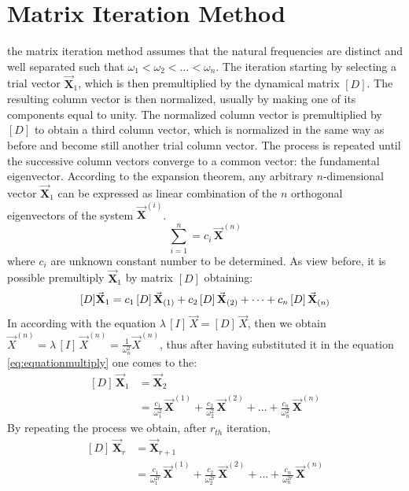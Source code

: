 \section{Matrix Iteration Method}\label{sec:mim}
the matrix iteration method assumes that the natural frequencies are distinct
and well separated such that \(\omega_1 < \omega_2 < \dots < \omega_n\).
The iteration starting by selecting a trial vector \(\vec{\mathbf{X}}_{1}\),
which is then premultiplied by the dynamical matrix \([D]\).
The resulting column vector is then normalized, usually by making one of its
components equal to unity.
The normalized column vector is premultiplied by \([D]\) to obtain a third
column vector, which is normalized in the same way as before and become still
another trial column vector.
The process is repeated until the successive column vectors converge to a common
vector: the fundamental eigenvector.
According to the expansion theorem, any arbitrary \(n\)-dimensional vector
\(\vec{\mathbf{X}}_{1}\) can be expressed as linear combination of the \(n\)
orthogonal eigenvectors of the system \(\vec{\mathbf{X}}^{(i)}\).
\begin{equation}\label{eq:expasniontheorem}
	\sum_{i = 1}^{n} = c_{i}\,\vec{\mathbf{X}}^{(n)}
\end{equation}
where \(c_{i}\) are unknown constant number to be determined.
As view before, it is possible premultiply \(\vec{\mathbf{X}}_{1}\) by matrix
\([D]\) obtaining:
\begin{equation}\label{eq:equationmultiply}
	[D] \vec{\mathbf{X}}_{1} = 	c_{1}\, [D] \,\vec{\mathbf{X}}_{(1)} +
								c_{2}\, [D] \,\vec{\mathbf{X}}_{(2)} + \dots +
  							c_{n}\, [D] \,\vec{\mathbf{X}}_{(n)}\\
\end{equation}
In according with the equation \(\lambda\,[I]\,\vec{X} = [D]\,\vec{X}\), then
we obtain
\(\vec{X}^{(n)} = \lambda\,[I]\,\vec{X}^{(n)} = \frac{1}{\omega^{2}_{n}}
\vec{X}^{(n)}\), thus after having substituted it in the equation
\eqref{eq:equationmultiply} one comes to the:
\begin{align}\label{eq:equationsubs}
  	[D]\,\vec{\mathbf{X}}_{1} &= \vec{\mathbf{X}}_{2}\\[0.75em]
      						&= \frac{c_{1}}{\omega^{2}_{1}}\,\vec{\mathbf{X}}^{(1)} +
		\frac{c_{2}}{\omega^{2}_{2}}\,\vec{\mathbf{X}}^{(2)} + \dots +
		\frac{c_{n}}{\omega^{2}_{n}}\,\vec{\mathbf{X}}^{(n)}
\end{align}
By repeating the process we obtain, after \(r_{th}\) iteration,
\begin{align}\label{eq:equationrth}
  	[D]\,\vec{\mathbf{X}}_{r} &= \vec{\mathbf{X}}_{r+1}\\[0.75em]
      						&= \frac{c_{1}}{\omega^{2r}_{1}}\,\vec{\mathbf{X}}^{(1)} +
		\frac{c_{2}}{\omega^{2r}_{2}}\,\vec{\mathbf{X}}^{(2)} + \dots +
		\frac{c_{n}}{\omega^{2r}_{n}}\,\vec{\mathbf{X}}^{(n)}
\end{align}
